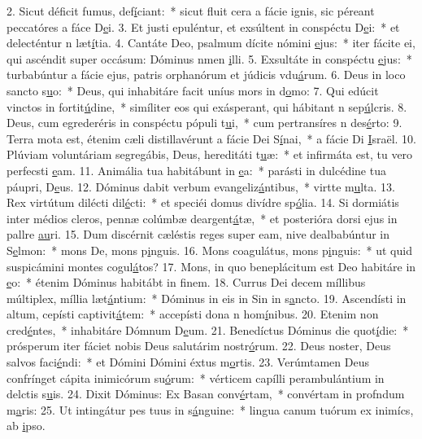 2. Sicut déficit fumus, def\uline{í}ciant:~* sicut fluit cera a fácie ignis, sic péreant peccatóres a fáce D\uline{e}i.
3. Et justi epuléntur, et exsúltent in conspéctu D\uline{e}i:~* et delecténtur n læt\uline{í}tia.
4. Cantáte Deo, psalmum dícite nómini \uline{e}jus:~* iter fácite ei, qui ascéndit super occásum: Dóminus nmen \uline{i}lli.
5. Exsultáte in conspéctu \uline{e}jus:~* turbabúntur a fácie ejus, patris orphanórum et júdicis vdu\uline{á}rum.
6. Deus in loco sancto s\uline{u}o:~* Deus, qui inhabitáre facit uníus mors in d\uline{o}mo:
7. Qui edúcit vinctos in fortit\uline{ú}dine,~* simíliter eos qui exásperant, qui hábitant n sep\uline{ú}lcris.
8. Deus, cum egrederéris in conspéctu pópuli t\uline{u}i,~* cum pertransíres n des\uline{é}rto:
9. Terra mota est, étenim cæli distillavérunt a fácie Dei S\uline{í}nai,~* a fácie Di \uline{I}sraël.
10. Plúviam voluntáriam segregábis, Deus, hereditáti t\uline{u}æ:~* et infirmáta est, tu vero perfecsti \uline{e}am.
11. Animália tua habitábunt in \uline{e}a:~* parásti in dulcédine tua páupri, D\uline{e}us.
12. Dóminus dabit verbum evangeliz\uline{á}ntibus,~* virtte m\uline{u}lta.
13. Rex virtútum dilécti dil\uline{é}cti:~* et speciéi domus divídre sp\uline{ó}lia.
14. Si dormiátis inter médios cleros, pennæ colúmbæ deargent\uline{á}tæ,~* et posterióra dorsi ejus in pallre \uline{au}ri.
15. Dum discérnit cæléstis reges super eam, nive dealbabúntur in S\uline{e}lmon:~* mons De, mons p\uline{i}nguis.
16. Mons coagulátus, mons p\uline{i}nguis:~* ut quid suspicámini montes cogul\uline{á}tos?
17. Mons, in quo beneplácitum est Deo habitáre in \uline{e}o:~* étenim Dóminus habitábt in f\uline{i}nem.
18. Currus Dei decem míllibus múltiplex, míllia læt\uline{á}ntium:~* Dóminus in eis in Sin in s\uline{a}ncto.
19. Ascendísti in altum, cepísti captivit\uline{á}tem:~* accepísti dona n hom\uline{í}nibus.
20. Etenim non cred\uline{é}ntes,~* inhabitáre Dómnum D\uline{e}um.
21. Benedíctus Dóminus die quot\uline{í}die:~* prósperum iter fáciet nobis Deus salutárim nostr\uline{ó}rum.
22. Deus noster, Deus salvos faci\uline{é}ndi:~* et Dómini Dómini éxtus m\uline{o}rtis.
23. Verúmtamen Deus confrínget cápita inimicórum su\uline{ó}rum:~* vérticem capílli perambulántium in delctis s\uline{u}is.
24. Dixit Dóminus: Ex Basan conv\uline{é}rtam,~* convértam in profndum m\uline{a}ris:
25. Ut intingátur pes tuus in s\uline{á}nguine:~* lingua canum tuórum ex inimícs, ab \uline{i}pso.
